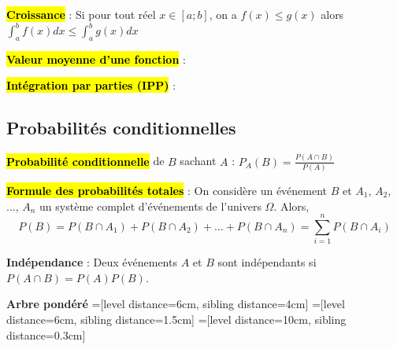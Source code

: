 \documentclass[10pt,fleqn, openany, landscape, twocolumn]{book} %
\begin{document}
\hl{\textbf{Croissance}} : Si pour tout réel $x\in [a;b]$, on a $f(x)\leqslant g(x)$ alors $\displaystyle\int_{a}^b f(x)dx\leqslant \displaystyle\int_{a}^b g(x)dx$

\hl{\textbf{Valeur moyenne d'une fonction}} : 

\hl{\textbf{Intégration par parties (IPP)}} : 

\subsection*{Probabilités conditionnelles}

\hl{\textbf{Probabilité conditionnelle}} de $B$ sachant $A$ : $P_A(B)=\frac{P(A \cap B)}{P(A)}$

\hl{\textbf{Formule des probabilités totales}} :  On considère un événement $B$ et $A_1$, $A_2$, ..., $A_n$ un système complet d'événements de l'univers $\Omega$. Alors,
\[P(B)=P(B \cap A_1) + P(B \cap A_2) + \ldots + P(B \cap A_n) = \displaystyle\sum_{i=1}^{n} P(B\cap A_i)\]

\textbf{Indépendance} : Deux événements $A$ et $B$ sont indépendants si $P(A \cap B)=P(A)P(B)$.

\textbf{Arbre pondéré}
\vspace{-2.5cm}
=[level distance=6cm, sibling distance=4cm]
=[level distance=6cm, sibling distance=1.5cm]
=[level distance=10cm, sibling distance=0.3cm]
\end{document}
